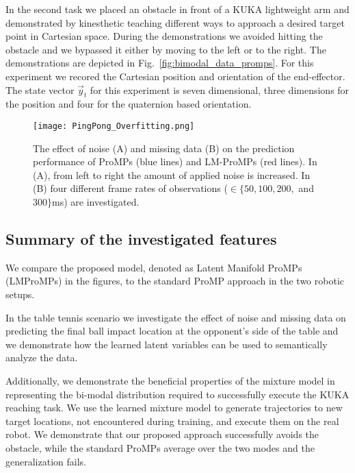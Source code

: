 In the second task we placed an obstacle in front of a KUKA lightweight arm and 
demonstrated by kinesthetic teaching different ways to approach a desired
target point in Cartesian space. During the demonstrations we avoided hitting
the obstacle and we bypassed it either by moving to the left or to the right. The
demonstrations are depicted in Fig.~\ref{fig:bimodal_data_promps}. For this
experiment we recored the Cartesian position and orientation of the
end-effector. The state vector $\vec y_t$ for this experiment is seven
dimensional, three dimensions for the position and four for the quaternion based
orientation. 


\begin{figure*}[!t]
\begin{center}
\texttt{[image: PingPong\_Overfitting.png]}
\end{center}
\caption{The effect of noise (A) and missing data (B) on the prediction performance of ProMPs (blue lines) and LM-ProMPs (red lines).  
In (A), from left to right the amount of applied noise is increased. 
In (B) four different frame rates of observations ($\in \{50, 100, 200, $ and $ 300\}$ms) are investigated.
\label{fig:pingpong_overfitting}}
\end{figure*}

\subsection{Summary of the investigated features}

We compare the proposed model, denoted as Latent Manifold ProMPs (LMProMPs) in the figures, 
to the standard ProMP approach in the two robotic setups. 

In the table tennis
scenario we investigate the effect of noise and missing data on predicting the
final ball impact location at the opponent's side of the table and we
demonstrate how the learned latent variables can be used to semantically analyze 
the data. 

Additionally, we demonstrate the beneficial properties of the mixture model
in representing the bi-modal distribution 
required to successfully execute the KUKA reaching task. We use the learned mixture model 
to generate trajectories to new target locations, not encountered during training, and execute
them on the real robot. We demonstrate that our proposed approach
successfully avoids the obstacle, while the standard ProMPs average over the two
modes and the generalization fails.


